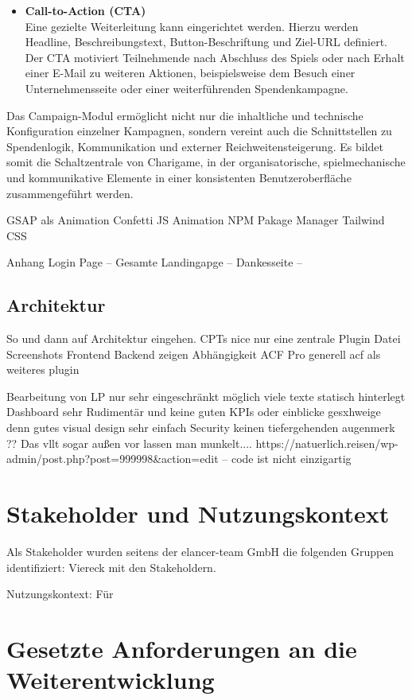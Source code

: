 \begin{itemize}
\item \textbf{Call-to-Action (CTA)} \\
Eine gezielte Weiterleitung kann eingerichtet werden. Hierzu werden Headline, Beschreibungstext, Button-Beschriftung und Ziel-URL definiert. Der CTA motiviert Teilnehmende nach Abschluss des Spiels oder nach Erhalt einer E-Mail zu weiteren Aktionen, beispielsweise dem Besuch einer Unternehmensseite oder einer weiterführenden Spendenkampagne.
\end{itemize}

Das Campaign-Modul ermöglicht nicht nur die inhaltliche und technische Konfiguration einzelner Kampagnen, sondern vereint auch die Schnittstellen zu Spendenlogik, Kommunikation und externer Reichweitensteigerung. Es bildet somit die Schaltzentrale von Charigame, in der organisatorische, spielmechanische und kommunikative Elemente in einer konsistenten Benutzeroberfläche zusammengeführt werden.

GSAP als Animation
Confetti JS Animation
NPM Pakage Manager
Tailwind CSS

Anhang
Login Page --
Gesamte Landingapge --
Dankesseite --

\subsection{Architektur}
So und dann auf Architektur eingehen.
CPTs nice
nur eine zentrale Plugin Datei
Screenshots Frontend Backend zeigen
Abhängigkeit ACF Pro generell acf als weiteres plugin

Bearbeitung von LP nur sehr eingeschränkt möglich viele texte statisch hinterlegt
Dashboard sehr Rudimentär und keine guten KPIs oder einblicke gesxhweige denn gutes visual design sehr einfach
Security keinen tiefergehenden augenmerk ?? Das vllt sogar außen vor lassen man munkelt....
https://natuerlich.reisen/wp-admin/post.php?post=999998&action=edit -- code ist nicht einzigartig
\section{Stakeholder und Nutzungskontext}
Als Stakeholder wurden seitens der elancer-team GmbH die folgenden Gruppen identifiziert:
Viereck mit den Stakeholdern.

Nutzungskontext: Für

\section{Gesetzte Anforderungen an die Weiterentwicklung}

